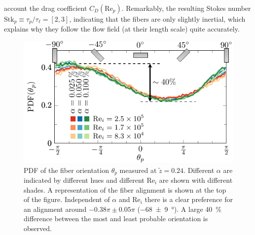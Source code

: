 account the drag coefficient $C_D(\text{Re}_p)$. Remarkably, the resulting
Stokes number $\text{Stk}_p \equiv \tau_p/\tau_\ell = [2, 3]$, indicating that
the fibers are only slightly inertial, which explains why they follow the flow
field (at their length scale) quite accurately.\\%
%
\begin{figure}[htp]
\centering
\includegraphics{figure4aorientationRe}
\caption{PDF of the fiber orientation $\theta_p$ measured at $\tilde{z} =
0.24$. Different $\alpha$ are indicated by different hues and different
$\text{Re}_i$ are shown with different shades. A representation of the fiber
alignment is shown at the top of the figure. Independent of $\alpha$ and
$\text{Re}_i$ there is a clear preference for an alignment around
$-0.38\pi \pm 0.05\pi$ (\SI[separate-uncertainty =
true,multi-part-units=single]{-68(9)}{\degree}). A large \SI{40}{\percent} difference between the most and
least probable orientation is observed.}
\label{fig:orientre}
\end{figure}
%
